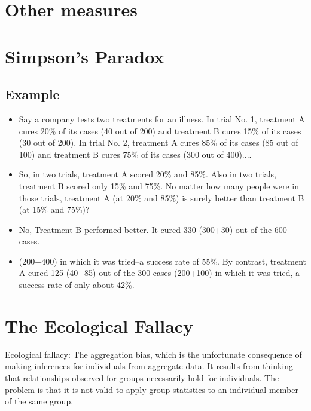 \documentclass[12pt, a4paper]{report}
\begin{document}
\newpage
\section{Other measures}
\section{Simpson's Paradox}

\subsection{Example}
\begin{itemize}
\item Say a company tests two treatments for an illness. In trial No. 1, treatment A cures 20\% of its cases (40 out of 200) and treatment B cures 15\% of its cases (30 out of 200). In trial No. 2, treatment A cures 85\% of its cases (85 out of 100) and treatment B cures 75\% of its cases (300 out of 400)....
\item
So, in two trials, treatment A scored 20\% and 85\%. Also in two trials, treatment B scored only 15\% and 75\%. No matter how many people were in those trials, treatment A (at 20\% and 85\%) is surely better than treatment B (at 15\% and 75\%)?
\item
No, Treatment B performed better. It cured 330 (300+30) out of the 600 cases.
\item
(200+400) in which it was tried--a success rate of 55\%. By contrast, treatment A cured 125 (40+85) out of the 300 cases (200+100) in which it was tried, a success rate of only about 42\%.
\end{itemize}


\section{The Ecological Fallacy}
Ecological fallacy: The aggregation bias, which is the unfortunate consequence of making inferences for individuals from aggregate data. It results from thinking that relationships observed for groups necessarily hold for individuals. The problem is that it is not valid to apply group statistics to an individual member of the same group.
\end{document}
